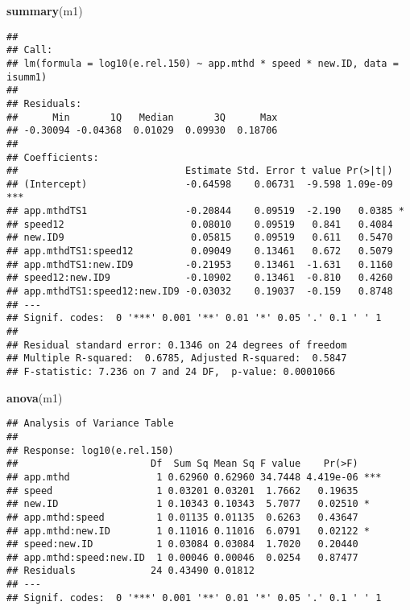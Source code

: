 \documentclass[
]{article}
\newenvironment{Shaded}{\begin{snugshade}}{\end{snugshade}}
\newcommand{\FunctionTok}[1]{\textcolor[rgb]{0.13,0.29,0.53}{\textbf{#1}}}
\newcommand{\NormalTok}[1]{#1}
\begin{document}
\begin{Shaded}
\begin{Highlighting}[]
\FunctionTok{summary}\NormalTok{(m1)}
\end{Highlighting}
\end{Shaded}

\begin{verbatim}
## 
## Call:
## lm(formula = log10(e.rel.150) ~ app.mthd * speed * new.ID, data = isumm1)
## 
## Residuals:
##      Min       1Q   Median       3Q      Max 
## -0.30094 -0.04368  0.01029  0.09930  0.18706 
## 
## Coefficients:
##                             Estimate Std. Error t value Pr(>|t|)    
## (Intercept)                 -0.64598    0.06731  -9.598 1.09e-09 ***
## app.mthdTS1                 -0.20844    0.09519  -2.190   0.0385 *  
## speed12                      0.08010    0.09519   0.841   0.4084    
## new.ID9                      0.05815    0.09519   0.611   0.5470    
## app.mthdTS1:speed12          0.09049    0.13461   0.672   0.5079    
## app.mthdTS1:new.ID9         -0.21953    0.13461  -1.631   0.1160    
## speed12:new.ID9             -0.10902    0.13461  -0.810   0.4260    
## app.mthdTS1:speed12:new.ID9 -0.03032    0.19037  -0.159   0.8748    
## ---
## Signif. codes:  0 '***' 0.001 '**' 0.01 '*' 0.05 '.' 0.1 ' ' 1
## 
## Residual standard error: 0.1346 on 24 degrees of freedom
## Multiple R-squared:  0.6785, Adjusted R-squared:  0.5847 
## F-statistic: 7.236 on 7 and 24 DF,  p-value: 0.0001066
\end{verbatim}

\begin{Shaded}
\begin{Highlighting}[]
\FunctionTok{anova}\NormalTok{(m1)}
\end{Highlighting}
\end{Shaded}

\begin{verbatim}
## Analysis of Variance Table
## 
## Response: log10(e.rel.150)
##                       Df  Sum Sq Mean Sq F value    Pr(>F)    
## app.mthd               1 0.62960 0.62960 34.7448 4.419e-06 ***
## speed                  1 0.03201 0.03201  1.7662   0.19635    
## new.ID                 1 0.10343 0.10343  5.7077   0.02510 *  
## app.mthd:speed         1 0.01135 0.01135  0.6263   0.43647    
## app.mthd:new.ID        1 0.11016 0.11016  6.0791   0.02122 *  
## speed:new.ID           1 0.03084 0.03084  1.7020   0.20440    
## app.mthd:speed:new.ID  1 0.00046 0.00046  0.0254   0.87477    
## Residuals             24 0.43490 0.01812                      
## ---
## Signif. codes:  0 '***' 0.001 '**' 0.01 '*' 0.05 '.' 0.1 ' ' 1
\end{verbatim}
\end{document}
